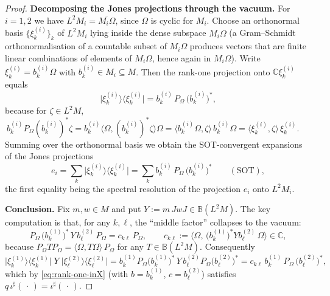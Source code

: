 \documentclass[a4paper, 11pt, reqno]{amsart}
\numberwithin{equation}{section}
\theoremstyle{plain}
\theoremstyle{remark}
\theoremstyle{definition}
\newcommand{\C}{\mathbb{C}}
\newcommand{\B}{\mathbb{B}}
\begin{document}
\begin{proof}
\medskip\noindent\textbf{Decomposing the Jones projections through the vacuum.}
For $i=1,2$ we have $L^2M_i=\overline{M_i\Omega}$, since $\Omega$ is cyclic for $M_i$. Choose an orthonormal basis $\{\xi^{(i)}_k\}_{k}$ of $L^2M_i$ lying inside the dense subspace $M_i\Omega$ (a Gram--Schmidt orthonormalisation of a countable subset of $M_i\Omega$ produces vectors that are finite linear combinations of elements of $M_i\Omega$, hence again in $M_i\Omega$). Write $\xi^{(i)}_k=b^{(i)}_k\Omega$ with $b^{(i)}_k\in M_i\subseteq M$. Then the rank-one projection onto $\C\xi^{(i)}_k$ equals
\begin{equation}\label{eq:rankone}
\big|\xi^{(i)}_k\big\rangle\big\langle\xi^{(i)}_k\big|=b^{(i)}_k\,P_\Omega\,\big(b^{(i)}_k\big)^*,
\end{equation}
because for $\zeta\in L^2M$, $\ b^{(i)}_k P_\Omega (b^{(i)}_k)^*\zeta=b^{(i)}_k\langle\Omega,(b^{(i)}_k)^*\zeta\rangle\Omega=\langle b^{(i)}_k\Omega,\zeta\rangle\,b^{(i)}_k\Omega=\langle\xi^{(i)}_k,\zeta\rangle\,\xi^{(i)}_k$. Summing over the orthonormal basis we obtain the SOT-convergent expansions of the Jones projections
\begin{equation}\label{eq:eSOT}
e_i=\sum_k\big|\xi^{(i)}_k\big\rangle\big\langle\xi^{(i)}_k\big|=\sum_k b^{(i)}_k\,P_\Omega\,\big(b^{(i)}_k\big)^*\qquad(\text{SOT}),
\end{equation}
the first equality being the spectral resolution of the projection $e_i$ onto $L^2M_i$.

\medskip\noindent\textbf{Conclusion.}
Fix $m,w\in M$ and put $Y:=m\,JwJ\in\B(L^2M)$. The key computation is that, for any $k,\ell$, the ``middle factor'' collapses to the vacuum:
\[
P_\Omega\,\big(b^{(1)}_k\big)^*\,Y\,b^{(2)}_\ell\,P_\Omega=c_{k\ell}\,P_\Omega,\qquad
c_{k\ell}:=\big\langle\Omega,\,\big(b^{(1)}_k\big)^*Yb^{(2)}_\ell\,\Omega\big\rangle\in\C ,
\]
because $P_\Omega T P_\Omega=\langle\Omega,T\Omega\rangle\,P_\Omega$ for any $T\in\B(L^2M)$. Consequently
\begin{equation}\label{eq:cross}
\big|\xi^{(1)}_k\big\rangle\big\langle\xi^{(1)}_k\big|\;Y\;\big|\xi^{(2)}_\ell\big\rangle\big\langle\xi^{(2)}_\ell\big|
=b^{(1)}_k P_\Omega \big(b^{(1)}_k\big)^*\,Y\,b^{(2)}_\ell P_\Omega \big(b^{(2)}_\ell\big)^*
=c_{k\ell}\,b^{(1)}_k\,P_\Omega\,\big(b^{(2)}_\ell\big)^* ,
\end{equation}
which by \eqref{eq:rank-one-inX} (with $b=b^{(1)}_k$, $c=b^{(2)}_\ell$) satisfies $q\,\iota^\sharp(\,\cdot\,)=\iota^\sharp(\,\cdot\,)$.


\end{proof}
\end{document}

